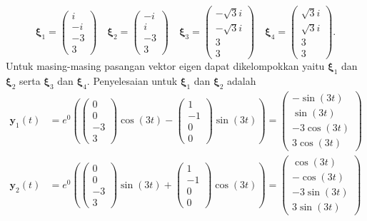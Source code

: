 \documentclass[a4paper]{article}
\theoremstyle{definisi}
\newcommand{\bfxi}{\boldsymbol{\xi}}
\numberwithin{equation}{section}
\begin{document}
\begin{enumerate}
    \[\bfxi_1 = \begin{pmatrix}i\\-i\\-3\\3\end{pmatrix} \quad \bfxi_2 = \begin{pmatrix}-i\\i\\-3\\3\end{pmatrix} \quad \bfxi_3 = \begin{pmatrix}-\sqrt{3}i\\-\sqrt{3}i\\3\\3\end{pmatrix} \quad \bfxi_4 = \begin{pmatrix}\sqrt{3}i\\\sqrt{3}i\\3\\3\end{pmatrix}.\]
    Untuk masing-masing pasangan vektor eigen dapat dikelompokkan yaitu $\bfxi_1$ dan $\bfxi_2$ serta $\bfxi_3$ dan $\bfxi_4$. Penyelesaian untuk $\bfxi_1$ dan $\bfxi_2$ adalah
    \begin{align*}
      \mathbf{y}_1(t) &= e^{0}\left(\begin{pmatrix}0\\0\\-3\\3\end{pmatrix}\cos(3t) - \begin{pmatrix}1\\-1\\0\\0\end{pmatrix}\sin(3t)\right)=\begin{pmatrix}-\sin(3t)\\\sin(3t)\\-3\cos(3t)\\3\cos(3t)\end{pmatrix}\\
      \mathbf{y}_2(t) &= e^{0}\left(\begin{pmatrix}0\\0\\-3\\3\end{pmatrix}\sin(3t) + \begin{pmatrix}1\\-1\\0\\0\end{pmatrix}\cos(3t)\right)=\begin{pmatrix}\cos(3t)\\-\cos(3t)\\-3\sin(3t)\\3\sin(3t)\end{pmatrix}

\end{align*}
\end{enumerate}
\end{document}
